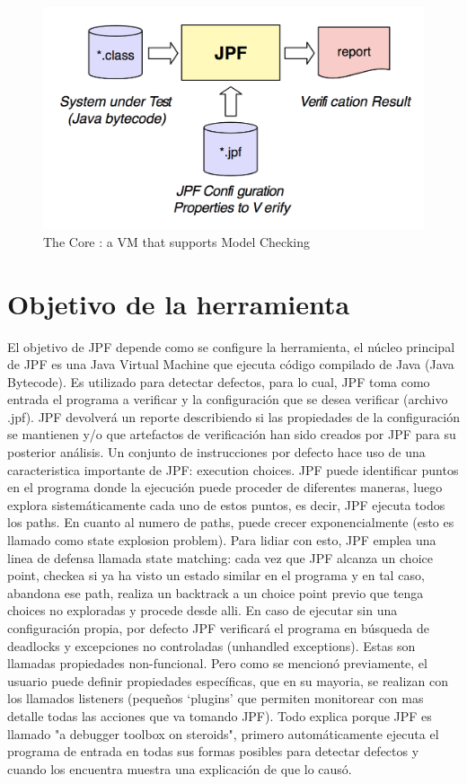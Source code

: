 \documentclass[runningheads]{llncs}
\begin{document}
\begin{figure}
\includegraphics[width=\textwidth]{fig1.png}
\caption{The Core : a VM that supports Model Checking} \label{fig1}
\end{figure}

\section{Objetivo de la herramienta}



El objetivo de JPF depende como se configure la herramienta, el n\'ucleo principal de JPF es una Java Virtual Machine que ejecuta c\'odigo compilado de Java (Java Bytecode). Es utilizado para detectar defectos, para lo cual, JPF toma como entrada el programa a verificar y la configuraci\'on que se desea verificar (archivo .jpf). JPF devolver\'a un reporte describiendo si las propiedades de la configuraci\'on se mantienen y/o que artefactos de verificaci\'on han sido creados por JPF para su posterior an\'alisis. 
Un conjunto de instrucciones por defecto hace uso de una caracteristica importante de JPF: execution choices. JPF puede identificar puntos en el programa donde la ejecuci\'on puede proceder de diferentes maneras, luego explora sistem\'aticamente cada uno de estos puntos, es decir, JPF ejecuta todos los paths. En cuanto al numero de paths, puede crecer exponencialmente (esto es llamado como state explosion problem). Para lidiar con esto, JPF emplea una linea de defensa llamada state matching: cada vez que JPF alcanza un choice point, checkea si ya ha visto un estado similar en el programa y en tal caso, abandona ese path, realiza un backtrack a un choice point previo que tenga choices no exploradas y procede desde alli. 
En caso de ejecutar sin una configuraci\'on propia, por defecto JPF verificar\'a el programa en b\'usqueda de deadlocks y excepciones no controladas (unhandled exceptions). Estas son llamadas propiedades non-funcional. Pero como se mencion\'o previamente, el usuario puede definir propiedades espec\'ificas, que en su mayoria, se realizan con los llamados listeners (peque\~nos ‘plugins’ que permiten monitorear con mas detalle todas las acciones que va tomando JPF). Todo explica porque JPF es llamado "a debugger toolbox on steroids", primero autom\'aticamente ejecuta el programa de entrada en todas sus formas posibles para detectar defectos y cuando los encuentra muestra una explicaci\'on de que lo caus\'o.
\end{document}

